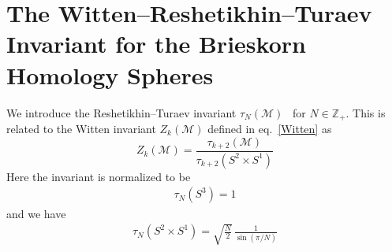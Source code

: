 \documentclass[12pt,reqno]{amsart}
\numberwithin{equation}{section}
\begin{document}
\section{The Witten--Reshetikhin--Turaev Invariant for the Brieskorn
  Homology Spheres}
\label{sec:invariant}


We introduce  the Reshetikhin--Turaev
invariant $\tau_N(\mathcal{M})$~\cite{ResheTurae91a} for $N\in\mathbb{Z}_+$.
This  is related to the Witten invariant
$Z_k(\mathcal{M})$ defined in eq.~\eqref{Witten} as
\begin{equation}
  \label{Witten_and_tau}
  Z_k(\mathcal{M})
  =
  \frac{
    \tau_{k+2}(\mathcal{M})
  }{
    \tau_{k+2}(S^2 \times S^1)
  }
\end{equation}
Here  the invariant is normalized to be
\begin{gather*}
  \tau_N (S^3) =1
\end{gather*}
and we have
\begin{gather*}
%
  \tau_N(S^2 \times S^1)
  =
  \sqrt{\frac{N}{2}} \, \frac{1}{\sin(\pi/N)}
\end{gather*}

\end{document}
